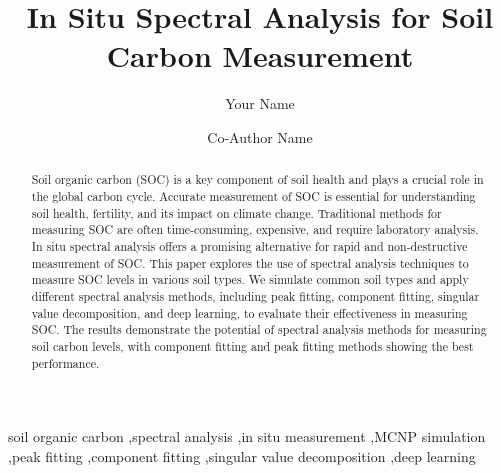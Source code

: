 \documentclass[review]{elsarticle}
\begin{document}
\begin{frontmatter}



\title{In Situ Spectral Analysis for Soil Carbon Measurement}


\author[first]{Your Name}

\author[second]{Co-Author Name}


\address[first]{Department, University Name, City, State, Country}
\address[second]{Department, University Name, City, State, Country}

\begin{abstract}
Soil organic carbon (SOC) is a key component of soil health and plays a crucial role in the global carbon cycle. Accurate measurement of SOC is essential for understanding soil health, fertility, and its impact on climate change. Traditional methods for measuring SOC are often time-consuming, expensive, and require laboratory analysis. In situ spectral analysis offers a promising alternative for rapid and non-destructive measurement of SOC. This paper explores the use of spectral analysis techniques to measure SOC levels in various soil types. We simulate common soil types and apply different spectral analysis methods, including peak fitting, component fitting, singular value decomposition, and deep learning, to evaluate their effectiveness in measuring SOC. The results demonstrate the potential of spectral analysis methods for measuring soil carbon levels, with component fitting and peak fitting methods showing the best performance.
\end{abstract}

\begin{keyword}
soil organic carbon \sep spectral analysis \sep in situ measurement \sep MCNP simulation \sep peak fitting \sep component fitting \sep singular value decomposition \sep deep learning
\end{keyword}

\end{frontmatter}
\end{document}
